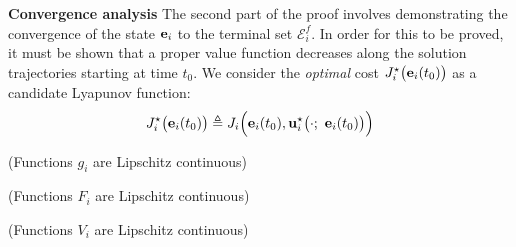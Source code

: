 \textbf{Convergence analysis}
The second part of the proof involves demonstrating the convergence of the
state $\bm{\mathbf{e}}_i$ to the terminal set $\mathcal{E}_i^f$. In order for this
to be proved, it must be shown that a proper value function decreases along
the solution trajectories starting at time $t_0$. We consider the
\textit{optimal} cost $J_i^{\star}\big(\bm{\mathbf{e}}_i(t_0)\big)$ as a candidate
Lyapunov function:
$$J_i^{\star}\big(\vect{e}_i(t_0)\big) \triangleq J_i \Big(\vect{e}_i(t_0), \vect{u}_i^{\star}\big(\cdot;\ \vect{e}_i(t_0)\big)\Big)$$




\begin{gg_box}
\begin{assumption} (Functions $g_i$ are Lipschitz continuous)
  \label{ass:g_i_Lipschitz}
\end{assumption}
\end{gg_box}

\begin{gg_box}
\begin{assumption} (Functions $F_i$ are Lipschitz continuous)
  \label{ass:F_i_Lipschitz}
\end{assumption}
\end{gg_box}


\begin{gg_box}
\begin{assumption} (Functions $V_i$ are Lipschitz continuous)
  \label{ass:V_i_Lipschitz}
\end{assumption}
\end{gg_box}
